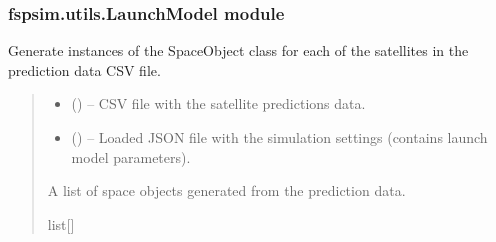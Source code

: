 \documentclass[letterpaper,10pt,english]{sphinxmanual}
\begin{document}
\subsubsection{fspsim.utils.LaunchModel module}
\label{\detokenize{fspsim.utils:module-fspsim.utils.LaunchModel}}\label{\detokenize{fspsim.utils:fspsim-utils-launchmodel-module}}

\begin{fulllineitems}
\label{\detokenize{fspsim.utils:fspsim.utils.LaunchModel.Prediction2SpaceObjects}}
\pysigstartsignatures
{}
\pysigstopsignatures
\sphinxAtStartPar
Generate instances of the SpaceObject class for each of the satellites in the prediction data CSV file.
\begin{quote}\begin{description}
\begin{itemize}
\item {} 
\sphinxAtStartPar
{} () – CSV file with the satellite predictions data.

\item {} 
\sphinxAtStartPar
{} () – Loaded JSON file with the simulation settings (contains launch model parameters).

\end{itemize}

\sphinxAtStartPar
A list of space objects generated from the prediction data.

\sphinxAtStartPar
list{[}{\hyperref[\detokenize{fspsim.utils:fspsim.utils.SpaceObject.SpaceObject}]{}}{]}

\end{description}\end{quote}

\end{fulllineitems}
\end{document}
